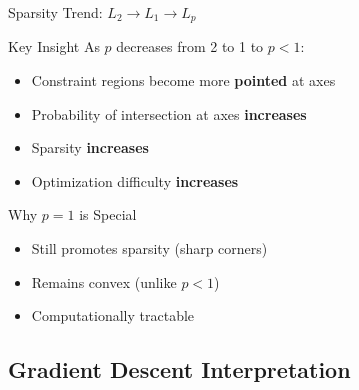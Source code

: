 \documentclass{beamer}
\begin{document}
\begin{frame}{Sparsity Trend: $L_2 \to L_1 \to L_p$}
\begin{theorembox}{Key Insight}
As $p$ decreases from 2 to 1 to $p < 1$:
\begin{itemize}
\item Constraint regions become more \textbf{pointed} at axes
\item Probability of intersection at axes \textbf{increases}
\item Sparsity \textbf{increases}
\item Optimization difficulty \textbf{increases}
\end{itemize}
\end{theorembox}
\pause

\begin{alertbox}{Why $p = 1$ is Special}
\begin{itemize}
\item Still promotes sparsity (sharp corners)
\item Remains convex (unlike $p < 1$)
\item Computationally tractable
\end{itemize}
\end{alertbox}
\end{frame}

\subsection{Gradient Descent Interpretation}
\end{document}
